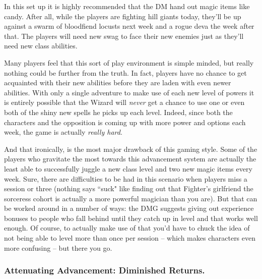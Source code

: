 In this set up it is highly recommended that the DM hand out magic items like candy. After all, while the players are fighting hill giants today, they'll be up against a swarm of bloodfiend locusts next week and a rogue deva the week after that. The players will need new swag to face their new enemies just as they'll need new class abilities.

Many players feel that this sort of play environment is simple minded, but really nothing could be further from the truth. In fact, players have no chance to get acquainted with their new abilities before they are laden with even newer abilities. With only a single adventure to make use of each new level of powers it is entirely possible that the Wizard will \textit{never} get a chance to use one or even both of the shiny new spells he picks up each level. Indeed, since both the characters and the opposition is coming up with more power and options each week, the game is actually \textit{really hard}.

And that ironically, is the most major drawback of this gaming style. Some of the players who gravitate the most towards this advancement system are actually the least able to successfully juggle a new class level and two new magic items every week. Sure, there are difficulties to be had in this scenario when players miss a session or three (nothing says ``suck" like finding out that Fighter's girlfriend the sorceress cohort is actually a more powerful magician than you are). But that can be worked around in a number of ways: the DMG suggests giving out experience bonuses to people who fall behind until they catch up in level and that works well enough. Of course, to actually make use of that you'd have to chuck the idea of not being able to level more than once per session -- which makes characters even more confusing -- but there you go.

\subsubsection{Attenuating Advancement: Diminished Returns.}
\vspace*{-8pt}

